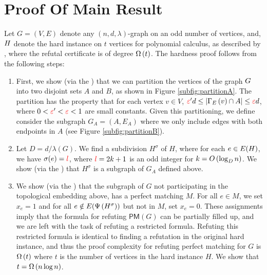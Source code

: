\documentclass[11pt]{article}
\newcommand{\PerfectMatching}[1]{\mathsf{PM}\left(#1\right)}
\newcommand{\EnDeeLambda}{(n, d, \lambda)}
\newcommand{\Subdivision}[2]{{#1}^{#2}}
\newcommand{\ExpansionFactor}[1]{\lambda(#1)}
\begin{document}
\section{Proof Of Main Result}

Let $G=(V,E)$ denote any $\EnDeeLambda$-graph on an odd number of vertices, and,  $H$ denote the hard instance on $t$ vertices for polynomial calculus, as described by \citet{buss1999linear}, where the refutal certificate is of degree $\Omega\left(t\right)$.
The hardness proof follows from the following steps:


\begin{enumerate}
	\item First, we show (via the ) that we can partition the vertices of the graph $G$ into two disjoint sets $A$ and $B$, as shown in Figure \ref{subfig:partitionA}. The partition has the property that for each vertex $v \in V$, $\textcolor{red}{\varepsilon}'d \leq |\Gamma_{E}\left(v\right) \cap A| \leq \textcolor{red}{\varepsilon} d$, where $0 <\textcolor{red}{\varepsilon} '< \textcolor{red}{\varepsilon} < 1$ are small constants. Given this partitioning, we define consider the subgraph $G_A = (A, E_A)$ where we only include edges with both endpoints in $A$ (see Figure \ref{subfig:partitionB}).
	\item Let $D = d/\ExpansionFactor{G}$. We find a subdivision $\Subdivision{H}{\sigma}$ of $H$, where for each $e \in E(H)$, we have $\sigma(e) = \textcolor{red}{l}$, where $\textcolor{red}{l} = 2k+1$ is an odd integer for $k = O\left(\log_{D} n\right)$. We show (via the ) that $\Subdivision{H}{\sigma}$ is a subgraph of $G_A$ defined above. 
	
	\item We show (via the ) that the subgraph of $G$ not participating in the topological embedding above, has a perfect matching $M$. For all $e \in M$, we set $x_e = 1$ and for all $e \notin \Edges{\Embedding{\Subdivision{H}{\sigma}}}$ but not in $M$, set $x_e = 0$. These assignments imply that the formula for refuting $\PerfectMatching{G}$ can be partially filled up, and we are left with the task of refuting a restricted formula. Refuting this restricted formula is identical to finding a refutation in the original hard instance, and thus the proof complexity for refuting perfect matching for $G$ is $\Omega\left(t\right)$ where $t$ is the number of vertices in the hard instance $H$. We show that $t = \Omega\left(n\log n\right)$.
\end{enumerate}
\end{document}

